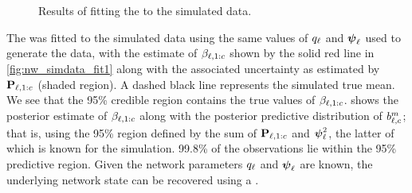 \begin{knitrout}\small
{}\color{fgcolor}\begin{figure}

{\centering {}\\
\\

}

\caption[Results of fitting the \kf{} to the simulated data]{Results of fitting the \kf{} to the simulated data.}\label{fig:nw_simdata_fit}
\end{figure}


\end{knitrout}

The \kf{} was fitted to the simulated data using the same values of $q_\ell$ and $\mathbf{\boldsymbol{\psi}}_\ell$ used to generate the data, with the estimate of $\beta_{\ell,1:c}$ shown by the solid red line in \cref{fig:nw_simdata_fit1} along with the associated uncertainty as estimated by $\mathbf{P}_{\ell,1:c}$ (shaded region). A dashed black line represents the simulated true mean. We see that the 95\% credible region contains the true values of $\beta_{\ell,1:c}$.  shows the posterior estimate of $\beta_{\ell,1:c}$ along with the posterior predictive distribution of $b_{\ell,c}^m$; that is, using the 95\% region defined by the sum of $\mathbf{P}_{\ell,1:c}$ and $\mathbf{\boldsymbol{\psi}}_\ell^2$, the latter of which is known for the simulation. 99.8\% of the observations lie within the 95\% predictive region. Given the network parameters $q_\ell$ and $\mathbf{\boldsymbol{\psi}}_\ell$ are known, the underlying network state can be recovered using a \kf{}.


